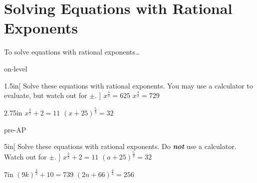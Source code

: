 \section{Solving Equations with Rational Exponents}

\begin{myConceptSteps}{To solve equations with rational exponents\dots}
\end{myConceptSteps}



\begin{taggedblock}{on-level}
    \begin{my2Problems}[\large]{1.5in}[
            Solve these equations with rational exponents.
            You may use a calculator to evaluate, but watch out for {\Large$\pm$}.
            ]
        {
            $ x^{\frac{4}{3}} = 625 $
        }
        {
            $ x^{\frac{3}{2}} = 729 $
        }
    \end{my2Problems}
    \begin{my2Problems}[\large]{2.75in}
        {
            $ x^{\frac{2}{3}} + 2 = 11 $
        }
        {
            $ (x+25)^{\frac{5}{3}} = 32 $
        }
    \end{my2Problems}
\end{taggedblock}

\begin{taggedblock}{pre-AP}
    \begin{my2Problems}[\large]{5in}[
            Solve these equations with rational exponents.
            Do {\bfseries\itshape not} use a calculator.
            Watch out for {\Large$\pm$}.
            ]
        {
            $ x^{\frac{2}{3}} + 2 = 11 $
        }
        {
            $ (a+25)^{\frac{5}{3}} = 32 $
        }
    \end{my2Problems}
    \begin{my2Problems}[\large]{7in}
        {
            $ (9k)^{\frac{3}{2}} + 10 = 739 $
        }
        {
            $ (2n + 66)^{\frac{4}{3}} = 256 $
        }
    \end{my2Problems}
\end{taggedblock}
